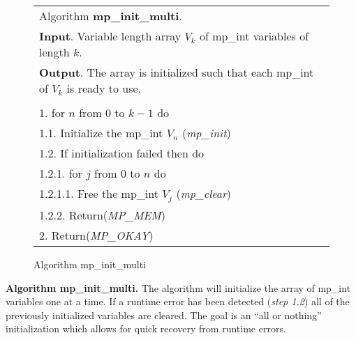 \documentclass[b5paper]{book}
\begin{document}
\newpage\begin{figure}[here]
\begin{center}
\begin{tabular}{l}
\hline Algorithm \textbf{mp\_init\_multi}. \\
\textbf{Input}.   Variable length array $V_k$ of mp\_int variables of length $k$. \\
\textbf{Output}.  The array is initialized such that each mp\_int of $V_k$ is ready to use. \\
\hline \\
1.  for $n$ from 0 to $k - 1$ do \\
\hspace{+3mm}1.1.  Initialize the mp\_int $V_n$ (\textit{mp\_init}) \\
\hspace{+3mm}1.2.  If initialization failed then do \\
\hspace{+6mm}1.2.1.  for $j$ from $0$ to $n$ do \\
\hspace{+9mm}1.2.1.1.  Free the mp\_int $V_j$ (\textit{mp\_clear}) \\
\hspace{+6mm}1.2.2.   Return(\textit{MP\_MEM}) \\
2.  Return(\textit{MP\_OKAY}) \\
\hline
\end{tabular}
\end{center}
\caption{Algorithm mp\_init\_multi}
\end{figure}

\textbf{Algorithm mp\_init\_multi.}
The algorithm will initialize the array of mp\_int variables one at a time.  If a runtime error has been detected 
(\textit{step 1.2}) all of the previously initialized variables are cleared.  The goal is an ``all or nothing'' 
initialization which allows for quick recovery from runtime errors.
\end{document}
